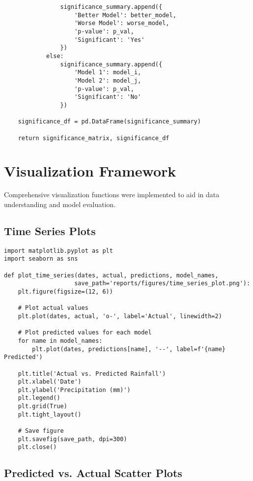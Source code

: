 \documentclass[12pt]{article}
\begin{document}
\begin{verbatim}
                significance_summary.append({
                    'Better Model': better_model,
                    'Worse Model': worse_model,
                    'p-value': p_val,
                    'Significant': 'Yes'
                })
            else:
                significance_summary.append({
                    'Model 1': model_i,
                    'Model 2': model_j,
                    'p-value': p_val,
                    'Significant': 'No'
                })
    
    significance_df = pd.DataFrame(significance_summary)
    
    return significance_matrix, significance_df
\end{verbatim}

\section{Visualization Framework}
\label{sec:visualization_framework}

Comprehensive visualization functions were implemented to aid in data understanding and model evaluation.

\subsection{Time Series Plots}
\label{subsec:time_series_plots}

\begin{verbatim}
import matplotlib.pyplot as plt
import seaborn as sns

def plot_time_series(dates, actual, predictions, model_names, 
                    save_path='reports/figures/time_series_plot.png'):
    plt.figure(figsize=(12, 6))
    
    # Plot actual values
    plt.plot(dates, actual, 'o-', label='Actual', linewidth=2)
    
    # Plot predicted values for each model
    for name in model_names:
        plt.plot(dates, predictions[name], '--', label=f'{name} Predicted')
    
    plt.title('Actual vs. Predicted Rainfall')
    plt.xlabel('Date')
    plt.ylabel('Precipitation (mm)')
    plt.legend()
    plt.grid(True)
    plt.tight_layout()
    
    # Save figure
    plt.savefig(save_path, dpi=300)
    plt.close()
\end{verbatim}

\subsection{Predicted vs. Actual Scatter Plots}
\label{subsec:scatter_plots}
\end{document}

